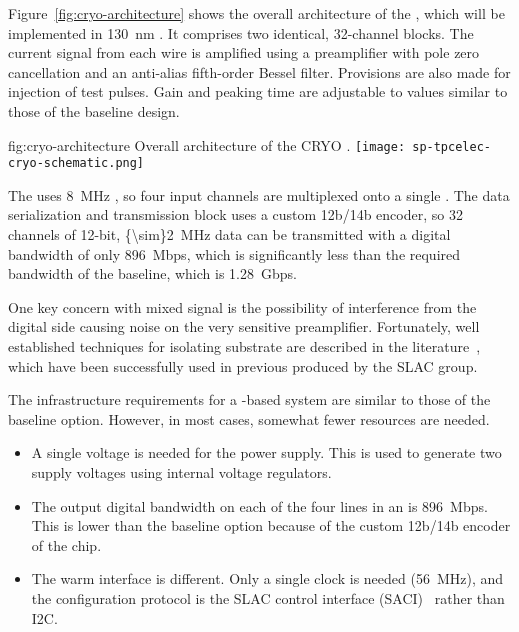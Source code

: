 Figure~\ref{fig:cryo-architecture} shows the overall architecture of the  , which will be implemented in \SI{130}{nm} .
It comprises two identical, \num{32}-channel blocks. 
The current signal from each wire is amplified using a preamplifier with pole zero cancellation and an anti-alias fifth-order Bessel filter. 
Provisions are also made for injection of test pulses. 
Gain and peaking time are adjustable to values similar to those of the baseline design.

\begin{dunefigure}
{fig:cryo-architecture}
{Overall architecture of the CRYO .}
\texttt{[image: sp-tpcelec-cryo-schematic.png]}
\end{dunefigure}

The  uses \SI{8}{MHz} , so four input channels are multiplexed onto a single . The data serialization and transmission block uses a custom 12b/14b encoder, so \num{32} channels of \num{12}-bit, \SI{{\sim}2}{MHz} data can be transmitted with a digital bandwidth of only \SI{896}{Mbps}, which is significantly less than the required bandwidth of the baseline, which is \SI{1.28}{Gbps}.

One key concern with mixed signal  is the possibility of interference from the digital side causing noise on the very sensitive preamplifier. 
Fortunately, well established techniques for isolating substrate are described in the literature~\cite{yeh}, which have been successfully used in previous  produced by the SLAC group.%


The infrastructure requirements for a  -based system are similar to those of the baseline option. However, in most cases, somewhat fewer resources are needed.
\begin{itemize}
\item{A single voltage is needed for the power supply. This is used to generate two supply voltages using internal voltage regulators.}
\item{The output digital bandwidth on each of the four lines in an  is \SI{896}{Mbps}. This is lower than the baseline option because of the custom 12b/14b encoder of the  chip. }
\item{The warm interface is different. Only a single clock is needed (\SI{56}{MHz}), and the configuration protocol is the SLAC  control interface (SACI)~\cite{SACI} rather than I2C.} 
\end{itemize}

